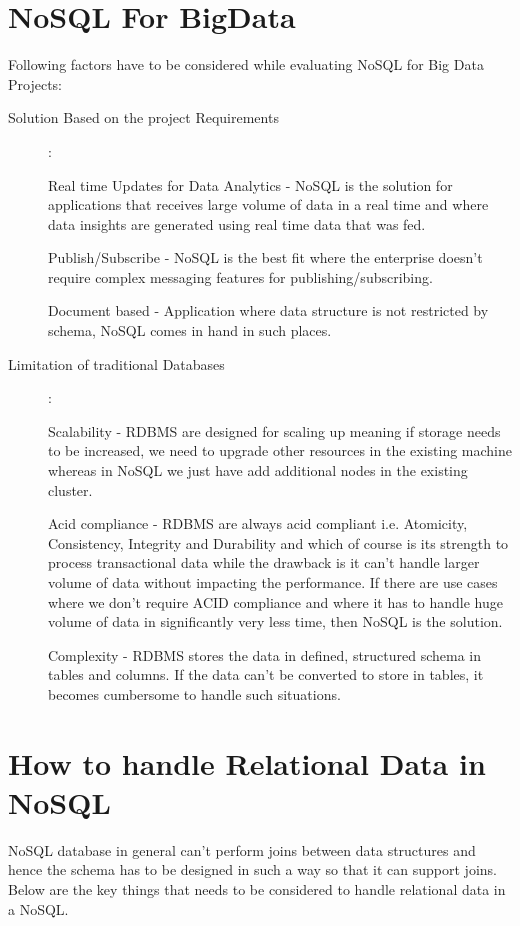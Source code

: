 \documentclass[sigconf]{acmart}
\begin{document}
\section{NoSQL For BigData}
Following factors have to be considered while evaluating NoSQL for Big Data Projects:
\begin{description}

    \item[Solution Based on the project Requirements]:

    Real time Updates for Data Analytics - NoSQL is the solution for applications that receives large volume of data in a real time and where data insights are generated using real time data that was fed.

    Publish/Subscribe - NoSQL is the best fit where the enterprise doesn't require complex messaging features for publishing/subscribing.

    Document based - Application where data structure is not restricted by schema, NoSQL comes in hand in such places.


    \item[Limitation of traditional Databases] :

    Scalability - RDBMS are designed for scaling up meaning if storage needs to be increased, we need to upgrade other resources in the existing machine whereas in NoSQL we just have add additional nodes in the existing cluster. 

    Acid compliance - RDBMS are always acid compliant i.e. Atomicity, Consistency, Integrity and Durability and which of course is its strength to process transactional data while the drawback is it can't handle larger volume of data without impacting the performance. If there are use cases where we don't require ACID compliance and  where it has to handle huge volume of data in significantly very less time, then NoSQL is the solution.

    Complexity - RDBMS stores the data in defined, structured schema in tables and columns. If the data can't be converted to store in tables, it becomes cumbersome to handle such situations. 

\end{description}

\section{How to handle Relational Data in NoSQL}
NoSQL database in general can't perform joins between data structures and hence the schema has to be designed in such a way so that it can support joins. Below are the key things that needs to be considered to handle relational data in a NoSQL.
\end{document}
